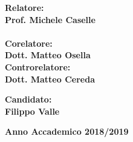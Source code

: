 \begin{titlepage}
\par
\noindent
\begin{minipage}[t]{0.47\textwidth}
{\large{\bf Relatore:\\
Prof. Michele Caselle}}\\
\vspace{4mm}
\\
{\large{\bf Corelatore:\\
Dott. Matteo Osella }}
\vspace{8mm}
{\large{\bf \\ Controrelatore:\\
Dott. Matteo Cereda}}
\end{minipage}
\hfill
\begin{minipage}[t]{0.47\textwidth}\raggedleft
\vspace{16mm}
{\large{\bf Candidato:\\
Filippo Valle}}
\end{minipage}
\vspace{9mm}
\begin{center}
{\large{\bf 
Anno Accademico 2018/2019}}
\end{center}

\end{titlepage}